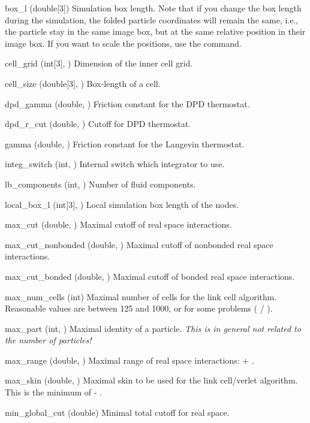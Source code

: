 \begin{globvar}
\item[box_l] (double[3]) Simulation box length. Note that
  if you change the box length during the simulation, the folded
  particle coordinates will remain the same, i.e., the particle stay
  in the same image box, but at the same relative position in their
  image box. If you want to scale the positions, use the
   command.
\item[cell_grid] (int[3], \ro) Dimension of the inner
  cell grid.
\item[cell_size] (double[3], \ro) Box-length of a cell.
\item[dpd_gamma] (double, \ro) Friction constant for the
  DPD thermostat.
\item[dpd_r_cut] (double, \ro) Cutoff for DPD thermostat.
\item[gamma] (double, \ro) Friction constant for the
  Langevin thermostat.
\item[integ_switch] (int, \ro) Internal switch which integrator to
  use.
\item[lb_components] (int, \ro) Number of fluid components.
\item[local_box_l] (int[3], \ro) Local simulation box length of the
  nodes.
\item[max_cut] (double, \ro) Maximal cutoff of real space
  interactions.
\item[max_cut_nonbonded] (double, \ro) Maximal cutoff of nonbonded
  real space interactions.
\item[max_cut_bonded] (double, \ro) Maximal cutoff of bonded
  real space interactions.
\item[max_num_cells] (int) Maximal number of cells for the link cell
  algorithm.  Reasonable values are between 125 and 1000, or for some
  problems ( / ).
\item[max_part] (int, \ro) Maximal identity of a particle.
  \emph{This is in general not related to the number of particles!}
\item[max_range] (double, \ro) Maximal range of real space
  interactions:  + .
\item[max_skin] (double, \ro) Maximal skin to be used for the link
  cell/verlet algorithm. This is the minimum of  -
  .
\item[min_global_cut] (double) Minimal total cutoff for real space.

\end{globvar}
